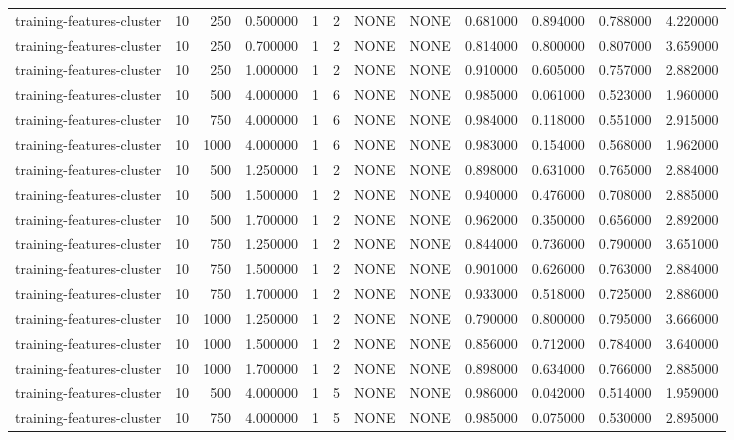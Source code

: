 \begin{tabular}{lrrrllllrrrr}
training-features-cluster & 10 & 250 & 0.500000 & 1 & 2 & NONE & NONE & 0.681000 & 0.894000 & 0.788000 & 4.220000 \\
training-features-cluster & 10 & 250 & 0.700000 & 1 & 2 & NONE & NONE & 0.814000 & 0.800000 & 0.807000 & 3.659000 \\
training-features-cluster & 10 & 250 & 1.000000 & 1 & 2 & NONE & NONE & 0.910000 & 0.605000 & 0.757000 & 2.882000 \\
training-features-cluster & 10 & 500 & 4.000000 & 1 & 6 & NONE & NONE & 0.985000 & 0.061000 & 0.523000 & 1.960000 \\
training-features-cluster & 10 & 750 & 4.000000 & 1 & 6 & NONE & NONE & 0.984000 & 0.118000 & 0.551000 & 2.915000 \\
training-features-cluster & 10 & 1000 & 4.000000 & 1 & 6 & NONE & NONE & 0.983000 & 0.154000 & 0.568000 & 1.962000 \\
training-features-cluster & 10 & 500 & 1.250000 & 1 & 2 & NONE & NONE & 0.898000 & 0.631000 & 0.765000 & 2.884000 \\
training-features-cluster & 10 & 500 & 1.500000 & 1 & 2 & NONE & NONE & 0.940000 & 0.476000 & 0.708000 & 2.885000 \\
training-features-cluster & 10 & 500 & 1.700000 & 1 & 2 & NONE & NONE & 0.962000 & 0.350000 & 0.656000 & 2.892000 \\
training-features-cluster & 10 & 750 & 1.250000 & 1 & 2 & NONE & NONE & 0.844000 & 0.736000 & 0.790000 & 3.651000 \\
training-features-cluster & 10 & 750 & 1.500000 & 1 & 2 & NONE & NONE & 0.901000 & 0.626000 & 0.763000 & 2.884000 \\
training-features-cluster & 10 & 750 & 1.700000 & 1 & 2 & NONE & NONE & 0.933000 & 0.518000 & 0.725000 & 2.886000 \\
training-features-cluster & 10 & 1000 & 1.250000 & 1 & 2 & NONE & NONE & 0.790000 & 0.800000 & 0.795000 & 3.666000 \\
training-features-cluster & 10 & 1000 & 1.500000 & 1 & 2 & NONE & NONE & 0.856000 & 0.712000 & 0.784000 & 3.640000 \\
training-features-cluster & 10 & 1000 & 1.700000 & 1 & 2 & NONE & NONE & 0.898000 & 0.634000 & 0.766000 & 2.885000 \\
training-features-cluster & 10 & 500 & 4.000000 & 1 & 5 & NONE & NONE & 0.986000 & 0.042000 & 0.514000 & 1.959000 \\
training-features-cluster & 10 & 750 & 4.000000 & 1 & 5 & NONE & NONE & 0.985000 & 0.075000 & 0.530000 & 2.895000 \\

\end{tabular}
